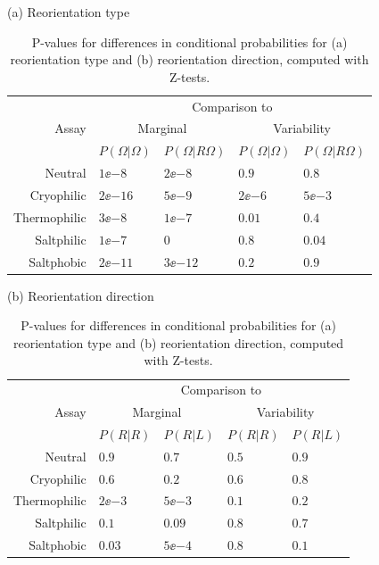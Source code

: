 \documentclass[12pt]{article}
\begin{document}
\begin{table}
  \begin{center}
  (a) Reorientation type\\
  \begin{tabular}{|r|l|l|l|l|}
    \hline
    \multirow{3}{*}{Assay} & \multicolumn{4}{|c|}{Comparison to} \\
    \cline{2-5}
      & \multicolumn{2}{|c|}{Marginal} & \multicolumn{2}{|c|}{Variability} \\
      \cline{2-5}
      & $P(\Omega|\Omega)$ & $P(\Omega|R\Omega)$ & $P(\Omega|\Omega)$ & $P(\Omega|R\Omega)$ \\
    \hline
    Neutral      & $1\ee{-8}$ & $2\ee{-8}$ & $0.9$ & $0.8$ \\
    Cryophilic   & $2\ee{-16}$ & $5\ee{-9}$ & $2\ee{-6}$ & $5\ee{-3}$ \\
    Thermophilic & $3\ee{-8}$ & $1\ee{-7}$ & $0.01$ & $0.4$ \\
    Saltphilic   & $1\ee{-7}$ & $0$ & $0.8$ & $0.04$ \\
    Saltphobic   & $2\ee{-11}$ & $3\ee{-12}$ & $0.2$ & $0.9$ \\
    \hline
  \end{tabular}

  \vspace{1cm}

  (b) Reorientation direction\\
  \begin{tabular}{|r|l|l|l|l|}
    \hline
    \multirow{3}{*}{Assay} & \multicolumn{4}{|c|}{Comparison to} \\
    \cline{2-5}
      & \multicolumn{2}{|c|}{Marginal} & \multicolumn{2}{|c|}{Variability} \\
      \cline{2-5}
      & $P(R|R)$ & $P(R|L)$ & $P(R|R)$ & $P(R|L)$ \\
    \hline
    Neutral      & $0.9$ & $0.7$ & $0.5$ & $0.9$ \\
    Cryophilic   & $0.6$ & $0.2$ & $0.6$ & $0.8$ \\
    Thermophilic & $2\ee{-3}$ & $5\ee{-3}$ & $0.1$ & $0.2$ \\
    Saltphilic   & $0.1$ & $0.09$ & $0.8$ & $0.7$ \\
    Saltphobic   & $0.03$ & $5\ee{-4}$ & $0.8$ & $0.1$ \\
    \hline
  \end{tabular}
  \end{center}
  \caption[P-values for differences in conditional probabilities.]{P-values for differences in conditional probabilities for (a) reorientation type and (b) reorientation direction, computed with Z-tests.}\label{tab:condpval}
\end{table}
\end{document}
